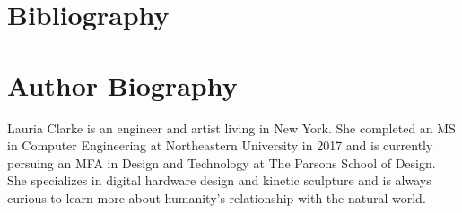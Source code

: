 \documentclass[letterpaper]{article}
\begin{document}



\section{Bibliography}

\section{Author Biography}
Lauria Clarke is an engineer and artist living in New York. She completed an MS in Computer Engineering at Northeastern University in 2017 and is currently persuing an MFA in Design and Technology at The Parsons School of Design. She specializes in digital hardware design and kinetic sculpture and is always curious to learn more about humanity's relationship with the natural world.

\end{document}
